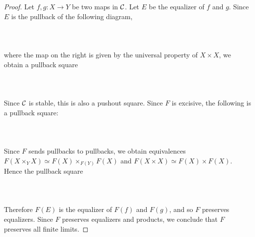 \begin{prp}
\begin{proof}
Let $f,g:X\to Y$ be two maps in $\mathcal{C}$. Let $E$ be the equalizer of $f$ and $g$. Since $E$ is the pullback of the following diagram,  
 \\~\\  \\~\\
where the map on the right is given by the universal property of $X\times X$, we obtain a pullback square  
 \\~\\  \\~\\
Since $\mathcal{C}$ is stable, this is also a pushout square. Since $F$ is excisive, the following is a pullback square:  
 \\~\\  \\~\\
Since $F$ sends pullbacks to pullbacks, we obtain equivalences $F(X\times_YX)\simeq F(X)\times_{F(Y)}F(X)$ and $F(X\times X)\simeq F(X)\times F(X)$. Hence the pullback square  
 \\~\\  \\~\\
Therefore $F(E)$ is the equalizer of $F(f)$ and $F(g)$, and so $F$ preserves equalizers. Since $F$ preserves equalizers and products, we conclude that $F$ preserves all finite limits. 
\end{proof}
\end{prp}

